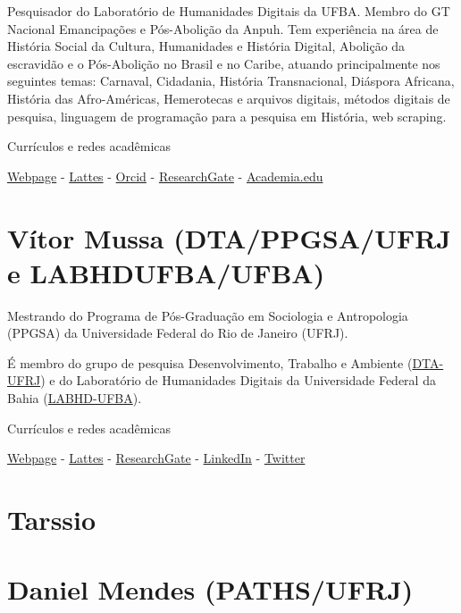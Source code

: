 \documentclass[
]{book}
\begin{document}
Pesquisador do Laboratório de Humanidades Digitais da UFBA. Membro do GT Nacional Emancipações e Pós-Abolição da Anpuh. Tem experiência na área de História Social da Cultura, Humanidades e História Digital, Abolição da escravidão e o Pós-Abolição no Brasil e no Caribe, atuando principalmente nos seguintes temas: Carnaval, Cidadania, História Transnacional, Diáspora Africana, História das Afro-Américas, Hemerotecas e arquivos digitais, métodos digitais de pesquisa, linguagem de programação para a pesquisa em História, web scraping.

Currículos e redes acadêmicas

\href{https://ericbrasiln.github.io}{Webpage} - \href{http://lattes.cnpq.br/6853705640900524}{Lattes} - \href{\%22https://orcid.org/0000-0001-5067-8475}{Orcid} - \href{https://www.researchgate.net/profile/Eric_Brasil}{ResearchGate} - \href{https://unilab.academia.edu/EricBrasil}{Academia.edu}

\hypertarget{vuxedtor-mussa-dtappgsaufrj-e-labhdufbaufba}{%
\section{Vítor Mussa (DTA/PPGSA/UFRJ e LABHDUFBA/UFBA)}\label{vuxedtor-mussa-dtappgsaufrj-e-labhdufbaufba}}

Mestrando do Programa de Pós-Graduação em Sociologia e Antropologia (PPGSA) da Universidade Federal do Rio de Janeiro (UFRJ).

É membro do grupo de pesquisa Desenvolvimento, Trabalho e Ambiente (\href{https://www.nucleodta.org/inicio}{DTA-UFRJ}) e do Laboratório de Humanidades Digitais da Universidade Federal da Bahia (\href{http://www.labhd.ufba.br/}{LABHD-UFBA}).

Currículos e redes acadêmicas

\href{https://vmussa.github.io}{Webpage} - \href{http://lattes.cnpq.br/2934187748254130}{Lattes} - \href{https://www.researchgate.net/profile/Vitor-Mussa-2}{ResearchGate} - \href{https://www.linkedin.com/in/vmussa/}{LinkedIn} - \href{https://twitter.com/vitormussa}{Twitter}

\hypertarget{tarssio}{%
\section{Tarssio}\label{tarssio}}

\hypertarget{daniel-mendes-pathsufrj}{%
\section{Daniel Mendes (PATHS/UFRJ)}\label{daniel-mendes-pathsufrj}}
\end{document}

